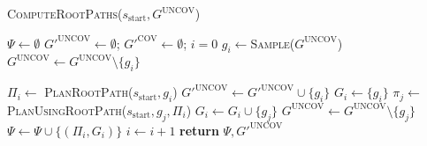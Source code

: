 \documentclass[conference]{IEEEtran}
\begin{document}
\begin{algorithm}[t]
\caption{\textsc{ComputeRootPaths}($s_{\textrm{start}}, G^{\textrm{UNCOV}}$)}
\label{alg:step1}
\begin{algorithmic}[1]
\State $\Psi \leftarrow \emptyset$   
\State $G'^{\textrm{UNCOV}} \leftarrow \emptyset$; \hspace{3mm}
       $G'^{\textrm{COV}} \leftarrow \emptyset$; \hspace{3mm}
       $i = 0$
    \State $g_i \leftarrow$\textsc{Sample}($G^{\textrm{UNCOV}}$)
    \State $G^{\textrm{UNCOV}}\leftarrow G^{\textrm{UNCOV}} \setminus \{g_i\}$
    
    \State $\Pi_i \leftarrow$ \textsc{PlanRootPath}($s_{\textrm{start}}, g_i$)
      
        \State $G'^{\textrm{UNCOV}} \leftarrow G'^{\textrm{UNCOV}} \cup \{g_i\}$
    \Else
        \State $G_i \leftarrow \{ g_i \}$
            \State $\pi_j \leftarrow$\textsc{PlanUsingRootPath}($s_{\textrm{start}},g_j,\Pi_i$)
             
                \State $G_i \leftarrow G_i \cup \{g_j\}$
                \State $G^{\textrm{UNCOV}} \leftarrow G^{\textrm{UNCOV}} \setminus \{g_j\}$
            \EndIf
        \EndFor
        \State $\Psi \leftarrow \Psi \cup \{ (\Pi_i, G_i)\}$
        \State $i \leftarrow i + 1$
    \EndIf
\EndWhile
\State \textbf{return} $\Psi, G'^{\textrm{UNCOV}}$
\end{algorithmic}
\end{algorithm}
\end{document}
